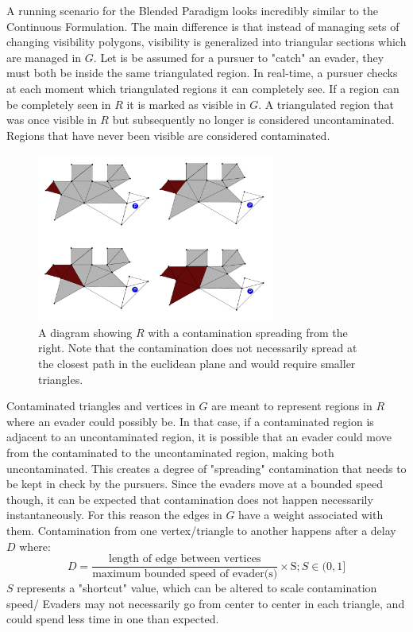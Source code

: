 \documentclass{article}
\begin{document}
A running scenario for the Blended Paradigm looks incredibly similar to the Continuous Formulation. The main difference is that instead of managing sets of changing visibility polygons, visibility is generalized into triangular sections which are managed in \(G\). Let is be assumed for a pursuer to "catch" an evader, they must both be inside the same triangulated region. In real-time, a pursuer checks at each moment which triangulated regions it can completely see. If a region can be completely seen in \(R\) it is marked as visible in \(G\). A triangulated region that was once visible in \(R\) but subsequently no longer is considered uncontaminated. Regions that have never been visible are considered contaminated. 

\begin{figure}[htb]
\centering
\includegraphics[width=0.7\textwidth]{"contamination"}
\caption{A diagram showing \(R\) with a contamination spreading from the right. Note that the contamination does not necessarily spread at the closest path in the euclidean plane and would require smaller triangles.}
\end{figure}

Contaminated triangles and vertices in \(G\) are meant to represent regions in \(R\) where an evader could possibly be. In that case, if a contaminated region is adjacent to an uncontaminated region, it is possible that an evader could move from the contaminated to the uncontaminated region, making both uncontaminated. This creates a degree of "spreading" contamination that needs to be kept in check by the pursuers. Since the evaders move at a bounded speed though, it can be expected that contamination does not happen necessarily instantaneously. For this reason the edges in \(G\) have a weight associated with them. Contamination from one vertex/triangle to another happens after a delay \(D\) where: \begin{displaymath}
D = \frac{\text{length of edge between vertices}}{\text{maximum bounded speed of evader(s)}}\times \text{S} ; S\in(0,1]
\end{displaymath}\(S\) represents a "shortcut" value, which can be altered to scale contamination speed/ Evaders may not necessarily go from center to center in each triangle, and could spend less time in one than expected.
\end{document}
